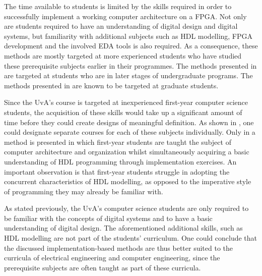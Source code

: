 \documentclass[openright]{template/uva-bachelor-thesis}
\begin{document}




The time available to students is limited by the skills required in order to successfully implement a working computer architecture on a FPGA. Not only are students required to have an understanding of digital design and digital systems, but familiarity with additional subjects such as HDL modelling, FPGA development and the involved EDA tools is also required. As a consequence, these methods are mostly targeted at more experienced students who have studied these prerequisite subjects earlier in their programmes. The methods presented in \cite{lee2012pipelined, kellett2012project} are targeted at students who are in later stages of undergraduate programs. The methods presented in \cite{nakano2008processor, jansen2014every, pereira2012basic} are known to be targeted at graduate students. 

Since the UvA's course is targeted at inexperienced first-year computer science students, the acquisition of these skills would take up a significant amount of time before they could create designs of meaningful definition. As shown in \cite[Fig. 1]{jansen2014every}, one could designate separate courses for each of these subjects individually. Only in \cite{cifredo2015computer} a method is presented in which first-year students are taught the subject of computer architecture and organization whilst simultaneously acquiring a basic understanding of HDL programming through implementation exercises. An important observation is that first-year students struggle in adopting the concurrent characteristics of HDL modelling, as opposed to the imperative style of programming they may already be familiar with. 

As stated previously, the UvA's computer science students are only required to be familiar with the concepts of digital systems and to have a basic understanding of digital design. The aforementioned additional skills, such as HDL modelling are not part of the students' curriculum. One could conclude that the discussed implementation-based methods are thus better suited to the curricula of electrical engineering and computer engineering, since the prerequisite subjects are often taught as part of these curricula. 
\end{document}
